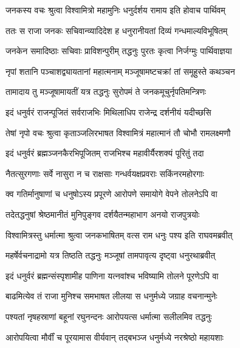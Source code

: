 
\twolineshloka
{जनकस्य वचः श्रुत्वा विश्वामित्रो महामुनिः}
{धनुर्दर्शय रामाय इति होवाच पार्थिवम्} %

\twolineshloka
{ततः स राजा जनकः सचिवान्व्यादिदेश ह}
{धनुरानीयतां दिव्यं गन्धमाल्यविभूषितम्} %

\twolineshloka
{जनकेन समादिष्ठाः सचिवाः प्राविशन्पुरीम्}
{तद्धनुः पुरतः कृत्वा निर्जग्मुः पार्थिवाज्ञया} %

\twolineshloka
{नृपां शतानि पञ्चाशद्व्यायतानां महात्मनाम्}
{मञ्जूषामष्टचक्रां तां समूहुस्ते कथञ्चन} %

\twolineshloka
{तामादाय तु मञ्जूषामायतीं यत्र तद्धनुः}
{सुरोपमं ते जनकमूचुर्नृपतिमन्त्रिणः} %

\twolineshloka
{इदं धनुर्वरं राजन्पूजितं सर्वराजभिः}
{मिथिलाधिप राजेन्द्र दर्शनीयं यदीच्छसि} %

\twolineshloka
{तेषां नृपो वचः श्रुत्वा कृताञ्जलिरभाषत}
{विश्वामित्रं महात्मानं तौ चोभौ रामलक्ष्मणौ} %

\twolineshloka
{इदं धनुर्वरं ब्रह्मञ्जनकैरभिपूजितम्}
{राजभिश्च महावीर्यैरशक्यं पूरितुं तदा} %

\twolineshloka
{नैतत्सुरगणाः सर्वे नासुरा न च राक्षसाः}
{गन्धर्वयक्षप्रवराः सकिंनरमहोरगाः} %

\twolineshloka
{क्व गतिर्मानुषाणां च धनुषोऽस्य प्रपूरणे}
{आरोपणे समायोगे वेपने तोलनेऽपि वा} %

\twolineshloka
{तदेतद्धनुषां श्रेष्ठमानीतं मुनिपुङ्गव}
{दर्शयैतन्महाभाग अनयो राजपुत्रयोः} %

\twolineshloka
{विश्वामित्रस्तु धर्मात्मा श्रुत्वा जनकभाषितम्}
{वत्स राम धनुः पश्य इति राघवमब्रवीत्} %

\twolineshloka
{महर्षेर्वचनाद्रामो यत्र तिष्ठति तद्धनुः}
{मञ्जूषां तामपावृत्य दृष्ट्वा धनुरथाब्रवीत्} %

\twolineshloka
{इदं धनुर्वरं ब्रह्मन्संस्पृशामीह पाणिना}
{यत्नवांश्च भविष्यामि तोलने पूरणेऽपि वा} %

\twolineshloka
{बाढमित्येव तं राजा मुनिश्च समभाषत}
{लीलया स धनुर्मध्ये जग्राह वचनान्मुनेः} %

\twolineshloka
{पश्यतां नृषहस्राणां बहूनां रघुनन्दनः}
{आरोपयत्स धर्मात्मा सलीलमिव तद्धनुः} %

\twolineshloka
{आरोपयित्वा मौर्वीं च पूरयामास वीर्यवान्}
{तद्बभञ्ज धनुर्मध्ये नरश्रेष्ठो महायशाः} %

